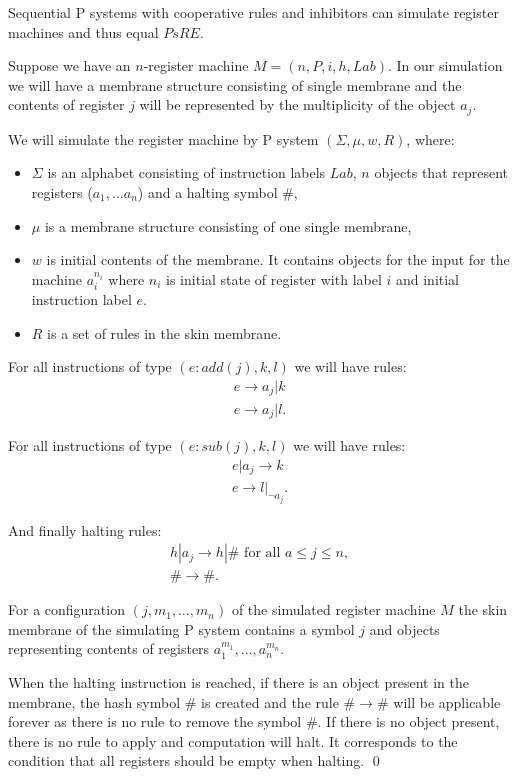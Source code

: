 \begin{veta}
  Sequential P systems with cooperative rules and inhibitors can simulate register machines and thus equal $PsRE$.
\end{veta}


\begin{dokaz}
\label{proof:reg_by_inh}
  Suppose we have an $n$-register machine $M = (n,P,i,h,Lab)$. In our simulation we will have a membrane structure consisting of single membrane and the contents of register $j$ will be represented by the multiplicity of the object $a_j$.

  We will simulate the register machine by P system $(\Sigma, \mu, w, R)$, where:
  \begin{itemize}
    \item $\Sigma$ is an alphabet consisting of instruction labels $Lab$, $n$ objects that represent registers ($a_1,\dots a_n$) and a halting symbol $\#$,
    \item $\mu$ is a membrane structure consisting of one single membrane,
    \item $w$ is initial contents of the membrane. It contains objects for the input for the machine $a_i^{n_i}$ where $n_i$ is initial state of register with label $i$ and initial instruction label $e$.
    \item $R$ is a set of rules in the skin membrane.
  \end{itemize}
    
  For all instructions of type $(e : add(j), k, l)$ we will have rules:
  \begin{align*}
    e \rightarrow a_j|k\\
    e \rightarrow a_j|l.
  \end{align*}

  For all instructions of type $(e : sub(j), k, l)$ we will have rules:
  \begin{align*}
    e|a_j \rightarrow k\\
    e \rightarrow l|_{\neg a_j}.
  \end{align*}

  And finally halting rules:
  \begin{align*}
    h|a_j \rightarrow h|\#\text{~for all~}a\leq j\leq n,\\
    \# \rightarrow \#.
  \end{align*}

  For a configuration $(j, m_1, \dots, m_n)$ of the simulated register machine $M$ the skin membrane of the simulating P system contains a symbol $j$ and objects representing contents of registers $a_1^{m_1}, \dots, a_n^{m_n}$.

  When the halting instruction is reached, if there is an object present in the membrane, the hash symbol $\#$ is created and the rule $\# \rightarrow \#$ will be applicable forever as there is no rule to remove the symbol $\#$. If there is no object present, there is no rule to apply and computation will halt. It corresponds to the condition that all registers should be empty when halting. \qed
\end{dokaz}